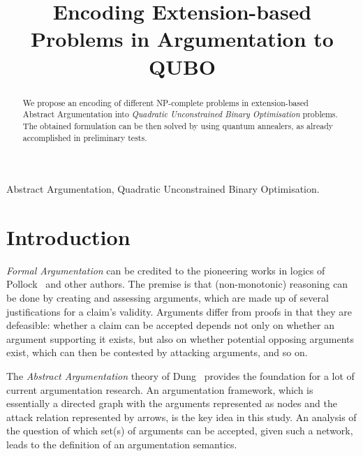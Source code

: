 \documentclass[conference]{IEEEtran}
\begin{document}
\title{Encoding Extension-based Problems in Argumentation to QUBO}

\author{
\and
{}
}

\maketitle

\begin{abstract}
We propose an encoding of different NP-complete problems in extension-based Abstract Argumentation into \emph{Quadratic Unconstrained Binary Optimisation} problems. The obtained formulation can be then solved by using quantum annealers, as already accomplished in preliminary tests.
\end{abstract}

\begin{IEEEkeywords}
Abstract Argumentation, Quadratic Unconstrained Binary Optimisation.
\end{IEEEkeywords}

\section{Introduction}\label{sect:intro}
\emph{Formal Argumentation} can be credited to the pioneering works in logics of Pollock~\cite{pollock92} and other authors. The premise is that (non-monotonic) reasoning can be done by creating and assessing arguments, which are made up of several justifications for a claim's validity. Arguments differ from proofs in that they are defeasible: whether a claim can be accepted depends not only on whether an argument supporting it exists, but also on whether potential opposing arguments exist, which can then be contested by attacking arguments, and so on.

The \emph{Abstract Argumentation} theory of Dung~\cite{Dung:1995} provides the foundation for a lot of current argumentation research. An argumentation framework, which is essentially a directed graph with the arguments represented as nodes and the attack relation represented by arrows, is the key idea in this study. An analysis of the question of which set(s) of arguments can be accepted, given such a network, leads to the definition of an argumentation semantics. 
\end{document}
